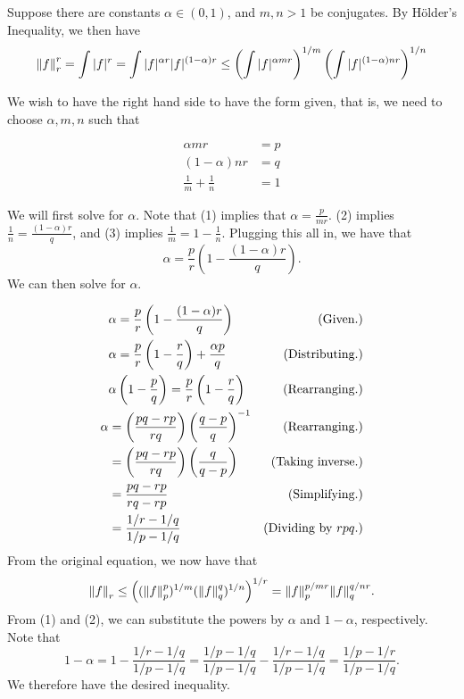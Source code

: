 \begin{solution}

    Suppose there are constants $\alpha \in (0, 1)$, and $m, n > 1$ be conjugates. By H\"older's Inequality, we then have 
    \[\norm{f}_r^r = \int |f|^r = \int |f|^{\alpha r} |f|^{(1 - \alpha)r} \leq \left( \int |f|^{\alpha m r}\right)^{1 / m} \left( \int |f|^{(1 - \alpha)nr}\right)^{1 / n} \]

    We wish to have the right hand side to have the form given, that is, we need to choose $\alpha, m , n$ such that
    \begin{center}
        \begin{align}
            \alpha m r &= p\\
            (1 - \alpha)nr &= q\\
            \frac{1}{m} + \frac{1}{n} &= 1        
        \end{align}
    \end{center}
    We will first solve for $\alpha$. Note that (1) implies that $\alpha = \frac{p}{mr}$. (2) implies $\frac{1}{n} = \frac{(1 - \alpha)r}{q}$, and (3) implies $\frac{1}{m} = 1 - \frac{1}{n}$. Plugging this all in, we have that 
    \[\alpha = \frac{p}{r}\left(1 - \frac{(1 - \alpha)r}{q}\right).\]
    We can then solve for $\alpha$.

    \tightalignbreak
    \begin{align*}
        &\alpha = \frac{p}{r}\left(1 - \frac{(1 - \alpha)r}{q}\right)&\text{(Given.)}\\
        &\alpha = \frac{p}{r}\left( 1 - \frac{r}{q}\right) + \frac{\alpha p}{q} &\text{(Distributing.)}\\
        &\alpha\left( 1 - \frac{p}{q} \right) = \frac{p}{r}\left(1 - \frac{r}{q}\right) &\text{(Rearranging.)}\\
        \alpha &= \left( \frac{pq - rp}{rq}\right)\left( \frac{q - p}{q}\right)^{-1} &\text{(Rearranging.)}\\
        &= \left( \frac{pq - rp}{rq}\right)\left( \frac{q}{q - p}\right) &\text{(Taking inverse.)}\\
        &= \frac{pq - rp}{rq - rp} &\text{(Simplifying.)}\\
        &= \frac{1/r - 1/q}{1/p-1/q} &\text{(Dividing by $rpq$.)}
    \end{align*}
    \vspace{-12mm}\alignbreak
    From the original equation, we now have that 
    \[\norm{f}_r \leq \left((\norm{f}^p_p)^{1/m} (\norm{f}_q^q)^{1/n}\right)^{1/r} = \norm{f}_p^{p/mr}\norm{f}_q^{q/nr}.\]
    From (1) and (2), we can substitute the powers by $\alpha$ and $1 - \alpha$, respectively. Note that
    \[1 - \alpha = 1 - \frac{1/r-1/q}{1/p - 1/q} = \frac{1/p-1/q}{1/p-1/q} - \frac{1/r-1/q}{1/p - 1/q} = \frac{1/p - 1/r}{1/p - 1/q}.\]
    We therefore have the desired inequality. 
\end{solution}

